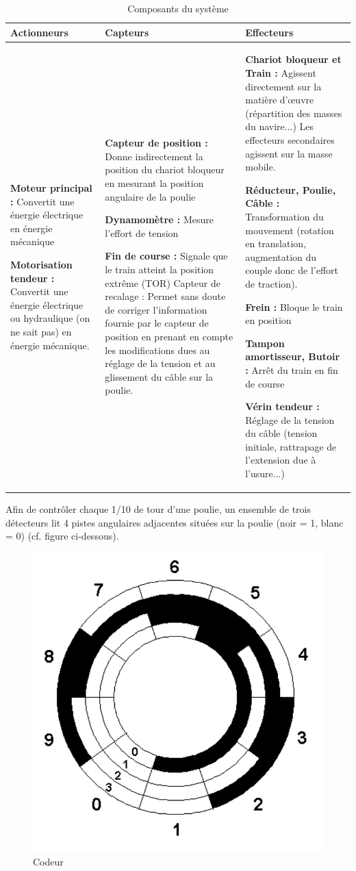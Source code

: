 \begin{table}[!h]
\begin{tabular}{|m{3.5cm}|m{5.5cm}|m{7cm}|}
\hline
Actionneurs	& Capteurs& Effecteurs \\
\hline
\textbf{Moteur principal :} Convertit une énergie électrique en énergie mécanique

\textbf{Motorisation tendeur :} Convertit une énergie électrique ou hydraulique (on ne sait pas) en énergie mécanique.
& 
\textbf{Capteur de position :} Donne indirectement la position du chariot bloqueur en mesurant la position angulaire de la poulie

\textbf{Dynamomètre :} Mesure l'effort de tension

\textbf{Fin de course :} Signale que le train atteint la position extrême (TOR)
Capteur de recalage : Permet sans doute de corriger l'information fournie par le capteur de position en prenant en compte les modifications dues au réglage de la tension et au glissement du câble sur la poulie.
&
\textbf{Chariot bloqueur et Train :} Agissent directement sur la matière d'\oe uvre (répartition des masses du navire...)
Les effecteurs secondaires agissent sur la masse mobile.

\textbf{Réducteur, Poulie, Câble :} Transformation du mouvement (rotation en translation, augmentation du couple donc de l'effort de traction).

\textbf{Frein :} Bloque le train en position

\textbf{Tampon amortisseur, Butoir :} Arrêt du train en fin de course

\textbf{Vérin tendeur :} Réglage de la tension du câble (tension initiale, rattrapage de l'extension due à l'usure...) \\
\hline
\end{tabular}
\caption{Composants du système}
\label{tab01}
\end{table}

Afin de contrôler chaque 1/10 de tour d'une poulie, un ensemble de trois détecteurs lit 4 pistes angulaires adjacentes situées sur la poulie (noir = 1, blanc = 0) (cf. figure ci-dessous).

\begin{figure}[!h]
\begin{center}
	\includegraphics[width=0.3\linewidth]{img/fig10}
\end{center}
\vspace{-1cm}
\caption{Codeur}
\label{fig10}
\end{figure} 

